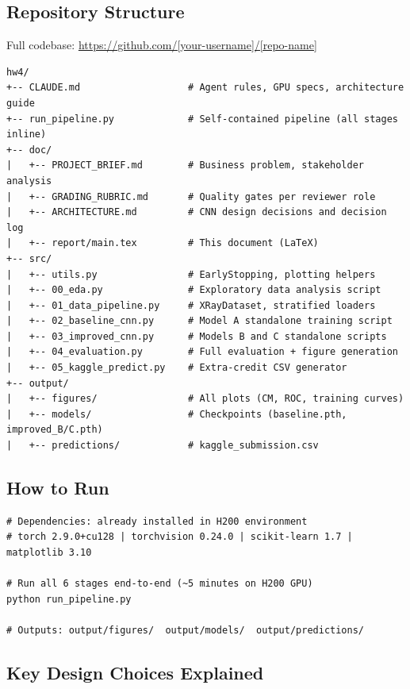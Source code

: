 \documentclass[11pt, letterpaper]{article}
\begin{document}
\subsection{Repository Structure}

Full codebase: \url{https://github.com/[your-username]/[repo-name]}

\begin{verbatim}
hw4/
+-- CLAUDE.md                   # Agent rules, GPU specs, architecture guide
+-- run_pipeline.py             # Self-contained pipeline (all stages inline)
+-- doc/
|   +-- PROJECT_BRIEF.md        # Business problem, stakeholder analysis
|   +-- GRADING_RUBRIC.md       # Quality gates per reviewer role
|   +-- ARCHITECTURE.md         # CNN design decisions and decision log
|   +-- report/main.tex         # This document (LaTeX)
+-- src/
|   +-- utils.py                # EarlyStopping, plotting helpers
|   +-- 00_eda.py               # Exploratory data analysis script
|   +-- 01_data_pipeline.py     # XRayDataset, stratified loaders
|   +-- 02_baseline_cnn.py      # Model A standalone training script
|   +-- 03_improved_cnn.py      # Models B and C standalone scripts
|   +-- 04_evaluation.py        # Full evaluation + figure generation
|   +-- 05_kaggle_predict.py    # Extra-credit CSV generator
+-- output/
|   +-- figures/                # All plots (CM, ROC, training curves)
|   +-- models/                 # Checkpoints (baseline.pth, improved_B/C.pth)
|   +-- predictions/            # kaggle_submission.csv
\end{verbatim}

\subsection{How to Run}

\begin{lstlisting}[caption={Run the complete pipeline}]
# Dependencies: already installed in H200 environment
# torch 2.9.0+cu128 | torchvision 0.24.0 | scikit-learn 1.7 | matplotlib 3.10

# Run all 6 stages end-to-end (~5 minutes on H200 GPU)
python run_pipeline.py

# Outputs: output/figures/  output/models/  output/predictions/
\end{lstlisting}

\subsection{Key Design Choices Explained}
\end{document}
